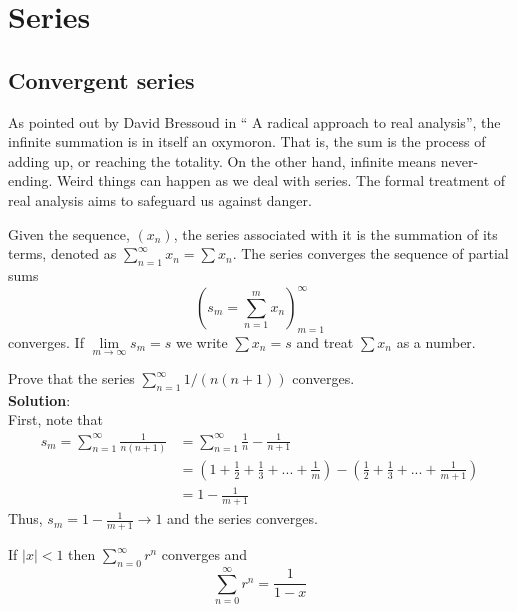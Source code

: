 \section{Series}

\subsection{Convergent series}

As pointed out by David Bressoud in `` A radical approach to real analysis'', the infinite summation is in itself an oxymoron. That is, the sum is the process of adding up, or reaching the totality. On the other hand, infinite means never-ending. Weird things can happen as we deal with series. The formal treatment of real analysis aims to safeguard us against danger. 

\begin{definition}
    Given the sequence, $(x_n)$, the series associated with it is the summation of its terms, denoted as $\sum \limits_{n=1}^\infty x_n = \sum x_n$. The series converges the sequence of partial sums
    \begin{equation}
        \left (
            s_m = \sum \limits_{n=1}^m x_n
        \right ) _{m=1}^\infty
    \end{equation}
    converges. If $\lim \limits_{m \to \infty} s_m = s$ we write $\sum x_n = s$ and treat $\sum x_n$ as a number.
\end{definition}

\begin{eg}
    Prove that the series $\sum _{n=1}^\infty 1/(n(n+1))$ converges. \\
    \textbf{Solution}: \\
    First, note that
    \begin{align*}
        s_m = \sum \limits_{n=1}^\infty \frac{1}{n(n+1)} &= \sum \limits_{n=1}^\infty \frac{1}{n} - \frac{1}{n+1} \\
        &= \left(
            1 + \frac{1}{2} + \frac{1}{3} + ... + \frac{1}{m}
        \right) - 
        \left(
            \frac{1}{2} + \frac{1}{3} + ... + \frac{1}{m+1}
        \right) \\
        &= 1 -\frac{1}{m+1}
    \end{align*}
    Thus, $s_m = 1 - \frac{1}{m+1} \to 1$ and the series converges.
\end{eg}

\begin{theorem}
    If $|x| < 1$ then $\sum _{n=0}^\infty r^n$ converges and
    \begin{equation}
        \sum \limits_{n=0}^\infty r^n = \frac{1}{1-x}
    \end{equation}
\end{theorem}

